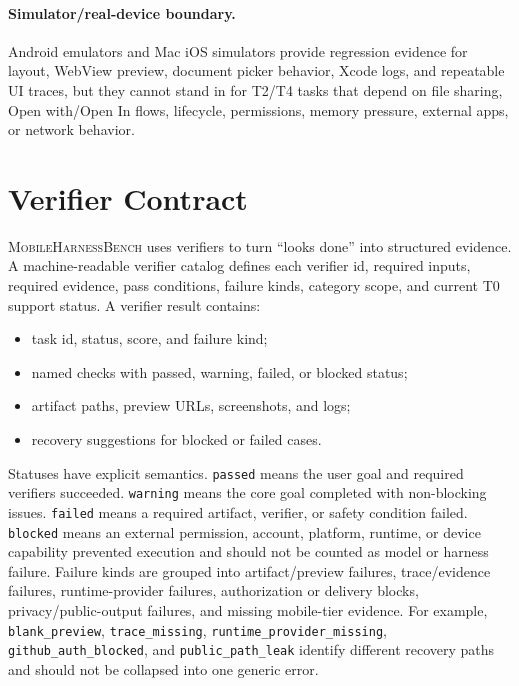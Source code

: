 \documentclass{article}
\newcommand{\mhb}{\textsc{MobileHarnessBench}}
\begin{document}
\paragraph{Simulator/real-device boundary.}
Android emulators and Mac iOS simulators provide regression evidence for layout, WebView preview, document picker behavior, Xcode logs, and repeatable UI traces, but they cannot stand in for T2/T4 tasks that depend on file sharing, Open with/Open In flows, lifecycle, permissions, memory pressure, external apps, or network behavior.

\section{Verifier Contract}

\mhb{} uses verifiers to turn ``looks done'' into structured evidence.
A machine-readable verifier catalog defines each verifier id, required inputs, required evidence, pass conditions, failure kinds, category scope, and current T0 support status.
A verifier result contains:
\begin{itemize}[leftmargin=1.5em]
    \item task id, status, score, and failure kind;
    \item named checks with passed, warning, failed, or blocked status;
    \item artifact paths, preview URLs, screenshots, and logs;
    \item recovery suggestions for blocked or failed cases.
\end{itemize}

Statuses have explicit semantics.
\texttt{passed} means the user goal and required verifiers succeeded.
\texttt{warning} means the core goal completed with non-blocking issues.
\texttt{failed} means a required artifact, verifier, or safety condition failed.
\texttt{blocked} means an external permission, account, platform, runtime, or device capability prevented execution and should not be counted as model or harness failure.
Failure kinds are grouped into artifact/preview failures, trace/evidence failures, runtime-provider failures, authorization or delivery blocks, privacy/public-output failures, and missing mobile-tier evidence.
For example, \texttt{blank\_preview}, \texttt{trace\_missing}, \texttt{runtime\_provider\_missing}, \texttt{github\_auth\_blocked}, and \texttt{public\_path\_leak} identify different recovery paths and should not be collapsed into one generic error.
\end{document}
